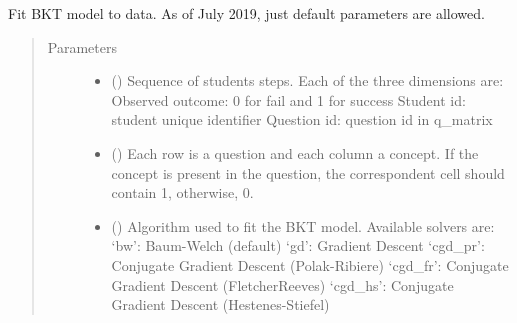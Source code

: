 \documentclass[letterpaper,10pt,english]{sphinxmanual}
\begin{document}
\begin{fulllineitems}

\begin{fulllineitems}
\label{\detokenize{bkt:bkt.BKT.fit}}
Fit BKT model to data.
As of July 2019, just default parameters are allowed.
\begin{quote}\begin{description}
\item[{Parameters}] \leavevmode\begin{itemize}
\item {} 
 (\sphinxstyleliteralemphasis{\sphinxupquote{, }}\sphinxstyleliteralemphasis{\sphinxupquote{ (}}\sphinxstyleliteralemphasis{\sphinxupquote{, }}\sphinxstyleliteralemphasis{\sphinxupquote{)}}) \textendash{} Sequence of students steps. Each of the three dimensions are:
Observed outcome: 0 for fail and 1 for success
Student id: student unique identifier
Question id: question id in q\_matrix

\item {} 
 (\sphinxstyleliteralemphasis{\sphinxupquote{, }}\sphinxstyleliteralemphasis{\sphinxupquote{ (}}\sphinxstyleliteralemphasis{\sphinxupquote{, }}\sphinxstyleliteralemphasis{\sphinxupquote{)}}) \textendash{} Each row is a question and each column a concept.
If the concept is present in the question, the
correspondent cell should contain 1, otherwise, 0.

\item {} 
 (\sphinxstyleliteralemphasis{\sphinxupquote{, }}) \textendash{} Algorithm used to fit the BKT model. Available solvers are:
‘bw’: Baum-Welch (default)
‘gd’: Gradient Descent
‘cgd\_pr’: Conjugate Gradient Descent (Polak-Ribiere)
‘cgd\_fr’: Conjugate Gradient Descent (Fletcher\textendash{}Reeves)
‘cgd\_hs’: Conjugate Gradient Descent (Hestenes-Stiefel)


\end{itemize}
\end{description}
\end{quote}
\end{fulllineitems}
\end{fulllineitems}
\end{document}
